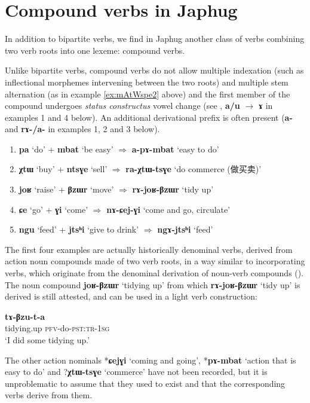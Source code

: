 \documentclass[11pt]{article}
\newcommand{\ipa}[1]{{\phon\textbf{#1}}}
\newcommand{\zh}[1]{{\cn #1}}
\newcommand{\jpg}[2]{\ipa{#1} `#2'}
\begin{document}
\section{Compound verbs in Japhug} \label{sec:compounds}
In addition to bipartite verbs, we find in Japhug another class of verbs combining two verb roots into one lexeme: compound verbs.

Unlike bipartite verbs,  compound verbs do not allow multiple indexation (such as inflectional morphemes intervening between the two roots) and multiple stem alternation (as in example \ref{ex:mAtWspe2} above) and the first member of the compound undergoes \textit{status constructus} vowel change (see  \citealt[1215]{jacques12incorp}, \ipa{a/u} $\rightarrow$ \ipa{ɤ} in examples 1 and 4 below). An additional derivational prefix is often present (\ipa{a-} and \ipa{rɤ-/a-} in examples 1, 2 and 3 below).

\begin{enumerate}
\item \jpg{pa}{do} + \jpg{mbat}{be easy} $\Rightarrow$ \jpg{a-pɤ-mbat}{easy to do}
\item \jpg{χtɯ}{buy} + \jpg{ntsɣe}{sell} $\Rightarrow$ \jpg{ra-χtɯ-tsɣe}{do commerce (\zh{做买卖})} 
\item \jpg{joʁ}{raise} + \jpg{βzɯr}{move}   $\Rightarrow$  \jpg{rɤ-joʁ-βzɯr}{tidy up}
\item \jpg{ɕe}{go} + \jpg{ɣi}{come} $\Rightarrow$ \jpg{nɤ-ɕej-ɣi}{come and go, circulate} 
\item \jpg{ngu}{feed} + \jpg{jtsʰi}{give to drink} $\Rightarrow$ \jpg{ngɤ-jtsʰi}{feed}
\end{enumerate}

The first four examples are actually historically denominal verbs, derived from action noun compounds made of two verb roots, in a way similar to incorporating verbs, which originate from the denominal derivation of noun-verb compounds (\citealt{jacques12incorp}). The noun compound \jpg{joʁ-βzɯr}{tidying up} from which \jpg{rɤ-joʁ-βzɯr}{tidy up} is derived is still attested, and can be used in a light verb construction:

\begin{exe}
\ex 
 \gll \ipa{joʁβzɯr} \ipa{tɤ-βzu-t-a} \\
 tidying.up \textsc{pfv}-do-\textsc{pst:tr-1sg} \\
 \glt `I did some tidying up.'
\end{exe}

The other action nominals *\ipa{ɕejɣi} `coming and going', *\ipa{pɤ-mbat} `action that is easy to do' and ?\ipa{χtɯ-tsɣe} `commerce' have not been recorded, but it is unproblematic to assume that they used to exist and that the corresponding verbs derive from them.
\end{document}
